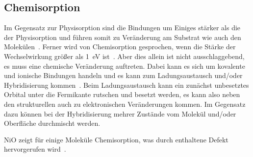         \subsection{Chemisorption}
            Im Gegensatz zur Physisorption sind die Bindungen um Einiges stärker als die der Physisorption und führen somit zu Veränderung am Substrat wie auch den Molekülen~\cite{bergenti_spinterface_2019}.
            Ferner wird von Chemisorption gesprochen, wenn die Stärke der Wechselwirkung größer als \SI{1}{\electronvolt} ist~\cite{muscat_chemisorption_1978}.
            Aber dies allein ist nicht ausschlaggebend, es muss eine chemische Veränderung auftreten.
            Dabei kann es sich um kovalente und ionische Bindungen handeln und es kann zum Ladungsaustausch und/oder Hybridisierung kommen~\cite{harutyunyan_hybridisation_2013}.
            Beim Ladungsaustausch kann ein zunächst unbesetztes Orbital unter die Fermikante rutschen und besetzt werden, es kann also neben den strukturellen auch zu elektronischen Veränderungen kommen.
            Im Gegensatz dazu können bei der Hybridisierung mehrer Zustände vom Molekül und/oder Oberfläche durchmischt werden.

            NiO zeigt für einige Moleküle Chemisorption, was durch enthaltene Defekt hervorgerufen wird~\cite{kunz_chemisorption_1985}.
        
